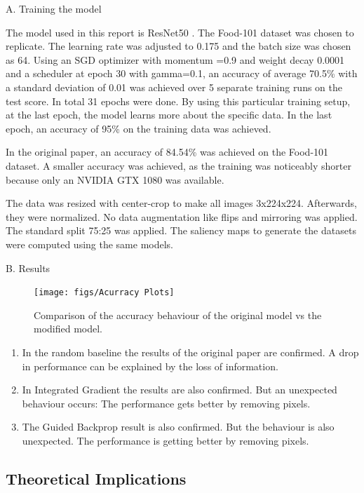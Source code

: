 A. Training the model

The model used in this report is ResNet50 \cite{he2015deep}. The Food-101 \cite{bossard14} dataset was chosen to replicate. The learning rate was adjusted to 0.175 and the batch size was chosen as 64. Using an SGD optimizer with momentum =0.9 and weight decay 0.0001 and a scheduler at epoch 30 with gamma=0.1, an accuracy of average 70.5\% with a standard deviation of 0.01 was achieved over 5 separate training runs on the test score. In total 31 epochs were done. 
By using this particular training setup, at the last epoch, the model learns more about the specific data. In the last epoch, an accuracy of 95\% on the training data was achieved.

In the original paper, an accuracy of 84.54\% was achieved on the Food-101 dataset. A smaller accuracy was achieved, as the training was noticeably shorter because only an NVIDIA GTX 1080 was available.

The data was resized with center-crop to make all images 3x224x224. Afterwards, they were normalized. No data augmentation like flips and mirroring was applied. The standard split 75:25 was applied. The saliency maps to generate the datasets were computed using the same models.

B. Results

\begin{figure}[h!]
	\centering
	\texttt{[image: figs/Acurracy Plots]}
	\caption {Comparison of the accuracy behaviour of the original model vs the modified model.}
	\label{fig:Sanity}
\end{figure}

\begin{enumerate}
	\item In the random baseline the results of the original paper are confirmed. A drop in performance can be explained by the loss of information.
	\item In Integrated Gradient the results are also confirmed. But an unexpected behaviour occurs: The performance gets better by removing pixels. 
	\item The Guided Backprop result is also confirmed. But the behaviour is also unexpected. The performance is getting better by removing pixels.
\end{enumerate}



\subsection{Theoretical Implications}


